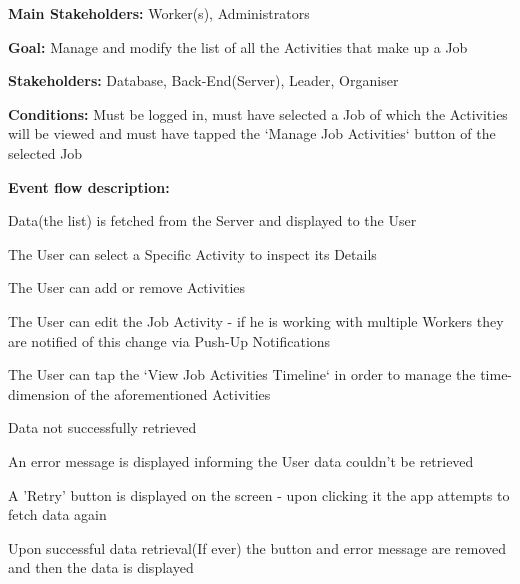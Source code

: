 			\noindent {}
			\begin{packed_item}
				\item \textbf{Main Stakeholders:} Worker(s), Administrators
				\item \textbf{Goal:} Manage and modify the list of all the Activities that make up a Job
				\item \textbf{Stakeholders: } Database, Back-End(Server), Leader, Organiser
				\item \textbf{Conditions: } Must be logged in, must have selected a Job of which the Activities will be viewed and must have tapped the `Manage Job Activities` button of the selected Job
				\item \textbf{Event flow description: }
				\begin{packed_enum}
					\item Data(the list) is fetched from the Server and displayed to the User
					\item The User can select a Specific Activity to inspect its Details
					\item The User can add or remove Activities
					\item The User can edit the Job Activity - if he is working with multiple Workers they are notified of this change via Push-Up Notifications
					\item The User can tap the `View Job Activities Timeline` in order to manage the time-dimension of the aforementioned Activities
				\end{packed_enum}
				
				\begin{packed_item}
					\item[1.a, 4.a] Data not successfully retrieved
					\item[] \begin{packed_enum}
						\item An error message is displayed informing the User data couldn't be retrieved
						\item A 'Retry' button is displayed on the screen - upon clicking it the app attempts to fetch data again
						\item Upon successful data retrieval(If ever) the button and error message are removed and then the data is displayed
					\end{packed_enum}
				\end{packed_item}
			\end{packed_item}
			

